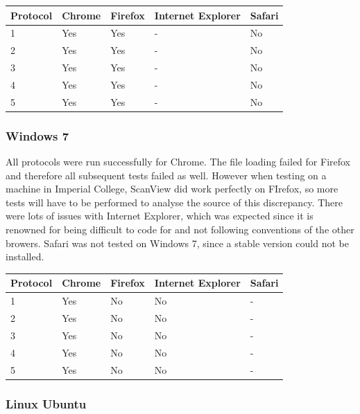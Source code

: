 \documentclass[a4paper,11pt,twoside]{article}
\begin{document}
\begin{center}
  \begin{tabular}{ | l || l | l | l | l |}
    \hline
    Protocol & Chrome & Firefox & Internet Explorer & Safari \\ \hline \hline
    1 & Yes & Yes  & - & No   \\ \hline
    2 & Yes & Yes & - & No \\ \hline
    3 & Yes & Yes & - & No  \\ \hline
    4 & Yes & Yes & - & No  \\ \hline
    5 & Yes & Yes & - & No  \\
    \hline
  \end{tabular}
\end{center}

\subsubsection*{Windows 7}

All protocols were run successfully for Chrome. The file loading failed for Firefox and therefore all subsequent tests failed as well. However when testing on a machine in Imperial College, ScanView did work perfectly on FIrefox, so more tests will have to be performed to analyse the source of this discrepancy. There were lots of issues with Internet Explorer, which was expected since it is renowned for being difficult to code for and not following conventions of the other browers. Safari was not tested on Windows 7, since a stable version could not be installed.

\begin{center}

  \begin{tabular}{ | l || l | l | l | l |}
    \hline
    Protocol & Chrome & Firefox & Internet Explorer & Safari \\ \hline \hline
    1 & Yes & No  & No  & - \\ \hline
    2 & Yes & No & No & - \\ \hline
    3 & Yes & No & No & - \\ \hline
    4 & Yes & No & No & - \\ \hline
    5 & Yes & No & No & - \\
    \hline
  \end{tabular}

\end{center}

\subsubsection*{Linux Ubuntu}
\end{document}
